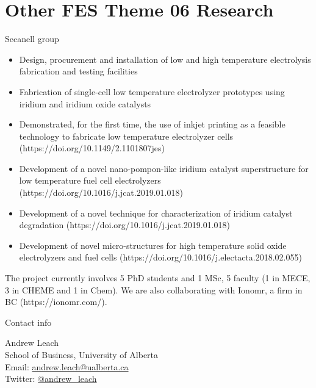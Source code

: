 \documentclass{beamer}
\renewcommand{\(}{\begin{columns}}
\renewcommand{\)}{\end{columns}}
\newcommand{\<}[1]{\begin{column}{#1}}
\renewcommand{\>}{\end{column}}
\begin{document}
\section{Other FES Theme 06 Research}
\begin{frame} Secanell group
\footnotesize{\begin{itemize}
  \item Design, procurement and installation of low and high temperature electrolysis fabrication and testing facilities
  \item Fabrication of single-cell low temperature electrolyzer prototypes using iridium and iridium oxide catalysts
  \item Demonstrated, for the first time, the use of inkjet printing as a feasible technology to fabricate low temperature electrolyzer cells  (https://doi.org/10.1149/2.1101807jes)
   \item Development of a novel nano-pompon-like iridium catalyst superstructure for low temperature fuel cell electrolyzers (https://doi.org/10.1016/j.jcat.2019.01.018)
   \item Development of a novel technique for characterization of iridium catalyst degradation (https://doi.org/10.1016/j.jcat.2019.01.018)
 \item Development of novel micro-structures for high temperature solid oxide electrolyzers and fuel cells (https://doi.org/10.1016/j.electacta.2018.02.055)
  \end{itemize}}
The project currently involves 5 PhD students and 1 MSc, 5 faculty (1 in MECE, 3 in CHEME and 1 in Chem). We are also collaborating with Ionomr, a firm in BC (https://ionomr.com/).
   \vfill
\end{frame}



\begin{frame}{Contact info}
\begin{center}
Andrew Leach\bigskip \\
School of Business, University of Alberta\bigskip \\
Email: \href{mailto:aleach@ualberta.ca}{andrew.leach@ualberta.ca}\bigskip \\
Twitter: \href{http://twitter.com/andrew_leach}{\url{@andrew_leach}}
\end{center}
\vfill
\end{frame}
\end{document}
